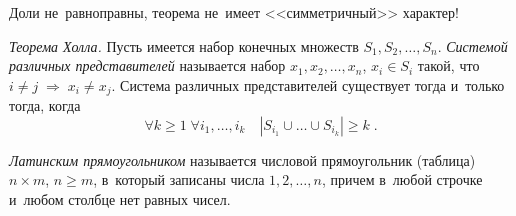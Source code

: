 Доли не~равноправны, теорема не~имеет <<симметричный>> характер!

\begin{problems}

\item\emph{Теорема Холла.}
Пусть имеется набор конечных множеств $S_1, S_2, \ldots, S_n$.
\emph{Системой различных представителей} называется набор
$x_1, x_2, \ldots, x_n$, $x_i \in S_i$ такой, что
\(
    i \neq j
\;\Rightarrow\;
    x_i \neq x_j
\).
Система различных представителей существует тогда и~только тогда, когда
\[
    \forall k \geq 1
\;
    \forall i_1, \ldots, i_k
\quad
    |S_{i_1} \cup \ldots \cup S_{i_k}| \geq k
\;.\]

\end{problems}

\emph{Латинским прямоугольником} называется числовой прямоугольник (таблица)
$n \times m$, $n \geq m$, в~который записаны числа $1, 2, \ldots, n$, причем
в~любой строчке и~любом столбце нет равных чисел.

